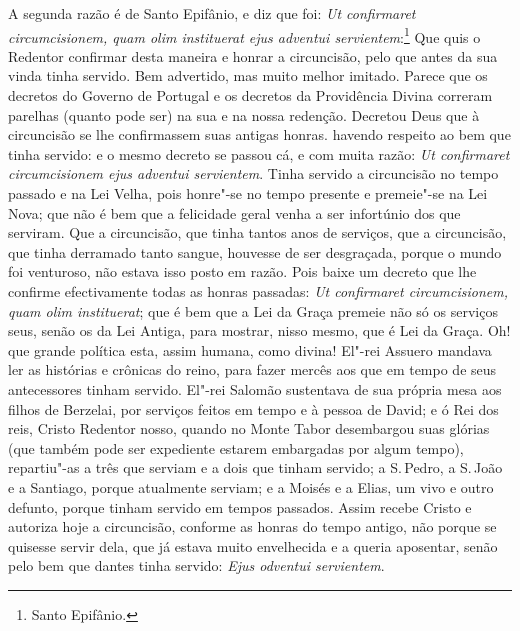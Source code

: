 A segunda razão é de Santo Epifânio, e diz que foi: \emph{Ut confirmaret
circumcisionem, quam olim instituerat ejus adventui servientem}:\footnote{Santo Epifânio.} Que
quis o Redentor confirmar desta maneira e honrar a circuncisão, pelo que
antes da sua vinda tinha servido. Bem advertido, mas muito melhor
imitado. Parece que os decretos do Governo de Portugal e os decretos da
Providência Divina correram parelhas (quanto pode ser) na sua e na nossa
redenção. Decretou Deus que à circuncisão se lhe confirmassem suas
antigas honras. havendo respeito ao bem que tinha servido: e o mesmo
decreto se passou cá, e com muita razão: \emph{Ut confirmaret
circumcisionem ejus adventui servientem}. Tinha servido a circuncisão no
tempo passado e na Lei Velha, pois honre"-se no tempo presente e
premeie"-se na Lei Nova; que não é bem que a felicidade geral venha a
ser infortúnio dos que serviram. Que a circuncisão, que tinha tantos
anos de serviços, que a circuncisão, que tinha derramado tanto sangue,
houvesse de ser desgraçada, porque o mundo foi venturoso, não estava
isso posto em razão. Pois baixe um decreto que lhe confirme
efectivamente todas as honras passadas: \emph{Ut confirmaret
circumcisionem, quam olim instituerat}; que é bem que a Lei da Graça
premeie não só os serviços seus, senão os da Lei Antiga, para mostrar,
nisso mesmo, que é Lei da Graça.
Oh! que grande política esta, assim humana, como divina! El"-rei Assuero
mandava ler as histórias e crônicas do reino, para fazer mercês aos que
em tempo de seus antecessores tinham servido. El"-rei Salomão sustentava
de sua própria mesa aos filhos de Berzelai, por serviços feitos em tempo
e à pessoa de David; e ó Rei dos reis, Cristo Redentor nosso, quando no
Monte Tabor desembargou suas glórias (que também pode ser expediente
estarem embargadas por algum tempo), repartiu"-as a três que serviam e a
dois que tinham servido; a S.\,Pedro, a S.\,João e a Santiago, porque
atualmente serviam; e a Moisés e a Elias, um vivo e outro defunto,
porque tinham servido em tempos passados. Assim recebe Cristo e autoriza
hoje a circuncisão, conforme as honras do tempo antigo, não porque se
quisesse servir dela, que já estava muito envelhecida e a queria
aposentar, senão pelo bem que dantes tinha servido: \emph{Ejus odventui
servientem}.

